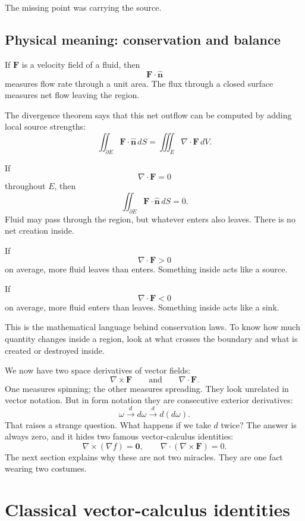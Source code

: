 The missing point was carrying the source.

\subsection{Physical meaning: conservation and balance}

If \(\mathbf F\) is a velocity field of a fluid, then
\[
    \mathbf F\cdot\widehat{\mathbf n}
\]
measures flow rate through a unit area.  The flux through a closed surface measures
net flow leaving the region.

The divergence theorem says that this net outflow can be computed by adding local
source strengths:
\[
    \iint_{\partial E}\mathbf F\cdot\widehat{\mathbf n}\,dS
    =
    \iiint_E \nabla\cdot\mathbf F\,dV.
\]

If
\[
    \nabla\cdot\mathbf F=0
\]
throughout \(E\), then
\[
    \iint_{\partial E}\mathbf F\cdot\widehat{\mathbf n}\,dS=0.
\]
Fluid may pass through the region, but whatever enters also leaves.  There is no net
creation inside.

If
\[
    \nabla\cdot\mathbf F>0
\]
on average, more fluid leaves than enters.  Something inside acts like a source.

If
\[
    \nabla\cdot\mathbf F<0
\]
on average, more fluid enters than leaves.  Something inside acts like a sink.

This is the mathematical language behind conservation laws.  To know how much
quantity changes inside a region, look at what crosses the boundary and what is
created or destroyed inside.

We now have two space derivatives of vector fields:
\[
    \nabla\times\mathbf F
    \qquad\text{and}\qquad
    \nabla\cdot\mathbf F.
\]
One measures spinning; the other measures spreading.  They look unrelated in vector
notation.  But in form notation they are consecutive exterior derivatives:
\[
    \omega
    \xrightarrow{\ d\ }
    d\omega
    \xrightarrow{\ d\ }
    d(d\omega).
\]
That raises a strange question.  What happens if we take \(d\) twice?  The answer is
always zero, and it hides two famous vector-calculus identities:
\[
    \nabla\times(\nabla f)=\mathbf 0,
    \qquad
    \nabla\cdot(\nabla\times\mathbf F)=0.
\]
The next section explains why these are not two miracles.  They are one fact wearing
two costumes.
\section{Classical vector-calculus identities}
\label{sec:15.7}

